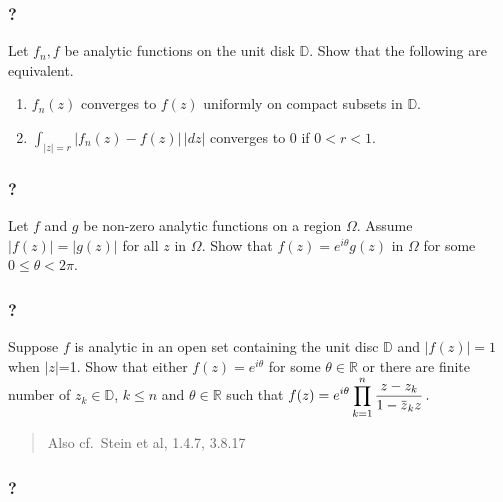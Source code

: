 \hypertarget{section-153}{%
\subsubsection{?}\label{section-153}}

Let \(f_n, f\) be analytic functions on the unit disk \({\mathbb D}\).
Show that the following are equivalent.

\begin{enumerate}
\def\labelenumi{(\roman{enumi})}
\item
  \(f_n(z)\) converges to \(f(z)\) uniformly on compact subsets in
  \(\mathbb D\).
\item
  \(\int_{|z|= r} |f_n(z) - f(z)| \, |dz|\) converges to \(0\) if
  \(0< r<1\).
\end{enumerate}

\hypertarget{section-154}{%
\subsubsection{?}\label{section-154}}

Let \(f\) and \(g\) be non-zero analytic functions on a region
\(\Omega\). Assume \(|f(z)| = |g(z)|\) for all \(z\) in \(\Omega\). Show
that \(f(z) = e^{i \theta} g(z)\) in \(\Omega\) for some
\(0 \leq \theta < 2 \pi\).

\hypertarget{section-155}{%
\subsubsection{?}\label{section-155}}

Suppose \(f\) is analytic in an open set containing the unit disc
\(\mathbb D\) and \(|f(z)| =1\) when \(|z|\)=1. Show that either
\(f(z) = e^{i \theta}\) for some \(\theta \in \mathbb R\) or there are
finite number of \(z_k \in \mathbb D\), \(k \leq n\) and
\(\theta \in \mathbb R\) such that
\(\displaystyle f(z) = e^{i\theta} \prod_{k=1}^n \frac{z-z_k}{1 - \mkern 1.5mu\overline{\mkern-1.5muz\mkern-1.5mu}\mkern 1.5mu_k z } \, .\)

\begin{quote}
Also cf.~Stein et al, 1.4.7, 3.8.17
\end{quote}

\hypertarget{section-156}{%
\subsubsection{?}\label{section-156}}


